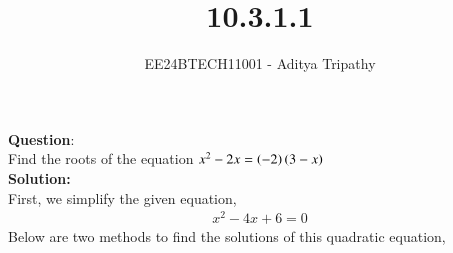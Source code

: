 \documentclass[journal]{IEEEtran}
\begin{document}

\vspace{3cm}

\title{10.3.1.1}
\author{EE24BTECH11001 - Aditya Tripathy}
 \maketitle
{\let\newpage\relax\maketitle}

\renewcommand{\thefigure}{\theenumi}
\renewcommand{\thetable}{\theenumi}
\setlength{\intextsep}{10pt} %


\renewcommand{\thetable}{\theenumi}


\textbf{Question}:\\
Find the roots of the equation $x^2 - 2x = \left(-2\right)\left(3-x\right)$
\\
\textbf{Solution: }\\
First, we simplify the given equation,
\begin{align}
   x^2 - 4x + 6 = 0 
\end{align}
Below are two methods to find the solutions of this quadratic equation,
\end{document}
